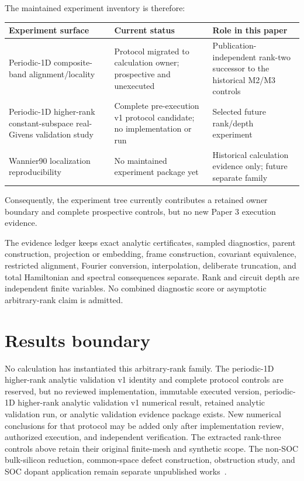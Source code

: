 \documentclass[11pt]{article}
\newenvironment{prospective}{\color{prospectivered}}{}
\begin{document}
\begin{prospective}
The maintained experiment inventory is therefore:
\begin{center}\small
\begin{tabularx}{\textwidth}{YYY}
\toprule
\textbf{Experiment surface} & \textbf{Current status} & \textbf{Role in this paper} \\
\midrule
Periodic-1D composite-band alignment/locality & Protocol migrated to calculation owner; prospective and unexecuted & Publication-independent rank-two successor to the historical M2/M3 controls \\
Periodic-1D higher-rank constant-subspace real-Givens validation study & Complete pre-execution v1 protocol candidate; no implementation or run & Selected future rank/depth experiment \\
Wannier90 localization reproducibility & No maintained experiment package yet & Historical calculation evidence only; future separate family \\
\bottomrule
\end{tabularx}
\end{center}
Consequently, the experiment tree currently contributes a retained owner boundary and
complete prospective controls, but no new Paper 3 execution evidence.

The evidence ledger keeps exact analytic certificates, sampled diagnostics, parent
construction, projection or embedding, frame construction, covariant equivalence,
restricted alignment, Fourier conversion, interpolation, deliberate truncation, and
total Hamiltonian and spectral consequences separate. Rank and circuit depth are
independent finite variables. No combined diagnostic score or asymptotic arbitrary-rank
claim is admitted.

\section{Results boundary}
No calculation has instantiated this arbitrary-rank family. The periodic-1D higher-rank analytic validation v1 identity and
complete protocol controls are reserved, but no reviewed implementation, immutable
executed version, periodic-1D higher-rank analytic validation v1 numerical result, retained analytic validation run, or analytic validation evidence package exists.
New numerical conclusions for that protocol may be added only after implementation review,
authorized execution, and independent verification. The extracted rank-three controls
above retain their
original finite-mesh and synthetic scope. The non-SOC bulk-silicon reduction,
common-space defect construction, obstruction study, and SOC dopant application remain
separate unpublished works~\cite{Ragasa2026d,Ragasa2026e,Ragasa2026f,Ragasa2026g}.
\end{prospective}

\clearpage
\appendix






\end{document}

